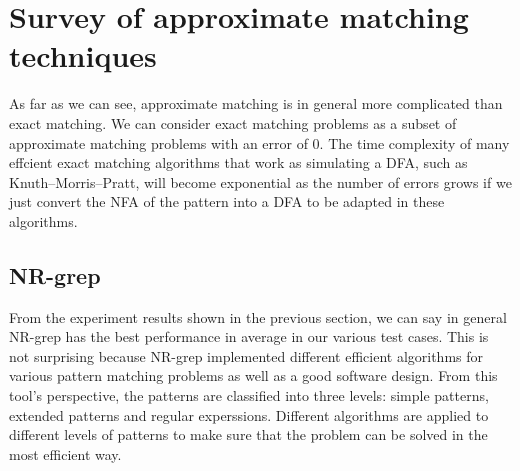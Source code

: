 \section{Survey of approximate matching techniques}
As far as we can see, approximate matching is in general more complicated than exact matching. We can consider exact matching problems as a subset of approximate matching problems with an error of 0. The time complexity of many effcient exact matching algorithms that work as simulating a DFA, such as Knuth–Morris–Pratt, will become exponential as the number of errors grows if we just convert the NFA of the pattern into a DFA to be adapted in these algorithms. 

\begin{comment}

\subsection{Dynamic programming}

One of the classical solutions to approximate matching problem is to use dynamic programming. This method is simple and easy to be implemented by programming. 



\subsection{Autamata simulation}
Another classical one is automata simulation. The algortihm BNDM  (we will explain later) over which NR-grep is built is basically a simulation of an NFA. 

\end{comment}


\subsection{NR-grep}
From the experiment results shown in the previous section, we can say in general NR-grep has the best performance in average in our various test cases. This is not surprising because NR-grep implemented different efficient algorithms for various pattern matching problems as well as a good software design. From this tool's perspective, the patterns are classified into three levels: simple patterns, extended patterns and regular experssions. Different algorithms are applied to different levels of patterns to make sure that the problem can be solved in the most efficient way. 

